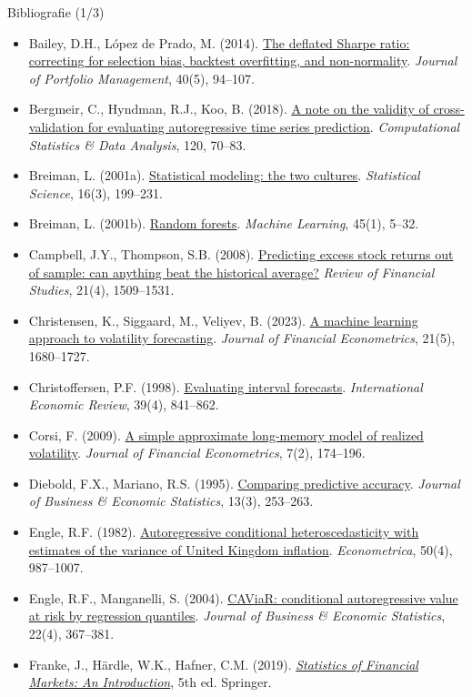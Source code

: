\begin{frame}{Bibliografie (1/3)}
\itemsize{\tiny}
\begin{itemize}
    \item Bailey, D.H., López de Prado, M. (2014). \href{https://doi.org/10.3905/jpm.2014.40.5.094}{The deflated Sharpe ratio: correcting for selection bias, backtest overfitting, and non-normality}. \textit{Journal of Portfolio Management}, 40(5), 94--107.
    \item Bergmeir, C., Hyndman, R.J., Koo, B. (2018). \href{https://doi.org/10.1016/j.csda.2017.11.003}{A note on the validity of cross-validation for evaluating autoregressive time series prediction}. \textit{Computational Statistics \& Data Analysis}, 120, 70--83.
    \item Breiman, L. (2001a). \href{https://doi.org/10.1214/ss/1009213726}{Statistical modeling: the two cultures}. \textit{Statistical Science}, 16(3), 199--231.
    \item Breiman, L. (2001b). \href{https://doi.org/10.1023/A:1010933404324}{Random forests}. \textit{Machine Learning}, 45(1), 5--32.
    \item Campbell, J.Y., Thompson, S.B. (2008). \href{https://doi.org/10.1093/rfs/hhm055}{Predicting excess stock returns out of sample: can anything beat the historical average?} \textit{Review of Financial Studies}, 21(4), 1509--1531.
    \item Christensen, K., Siggaard, M., Veliyev, B. (2023). \href{https://doi.org/10.1093/jjfinec/nbac020}{A machine learning approach to volatility forecasting}. \textit{Journal of Financial Econometrics}, 21(5), 1680--1727.
    \item Christoffersen, P.F. (1998). \href{https://doi.org/10.2307/2527341}{Evaluating interval forecasts}. \textit{International Economic Review}, 39(4), 841--862.
    \item Corsi, F. (2009). \href{https://doi.org/10.1093/jjfinec/nbp001}{A simple approximate long-memory model of realized volatility}. \textit{Journal of Financial Econometrics}, 7(2), 174--196.
    \item Diebold, F.X., Mariano, R.S. (1995). \href{https://doi.org/10.1080/07350015.1995.10524599}{Comparing predictive accuracy}. \textit{Journal of Business \& Economic Statistics}, 13(3), 253--263.
    \item Engle, R.F. (1982). \href{https://doi.org/10.2307/1912773}{Autoregressive conditional heteroscedasticity with estimates of the variance of United Kingdom inflation}. \textit{Econometrica}, 50(4), 987--1007.
    \item Engle, R.F., Manganelli, S. (2004). \href{https://doi.org/10.1198/073500104000000370}{CAViaR: conditional autoregressive value at risk by regression quantiles}. \textit{Journal of Business \& Economic Statistics}, 22(4), 367--381.
    \item Franke, J., Härdle, W.K., Hafner, C.M. (2019). \href{https://doi.org/10.1007/978-3-030-13751-9}{\textit{Statistics of Financial Markets: An Introduction}}, 5th ed. Springer.
\end{itemize}
\end{frame}

